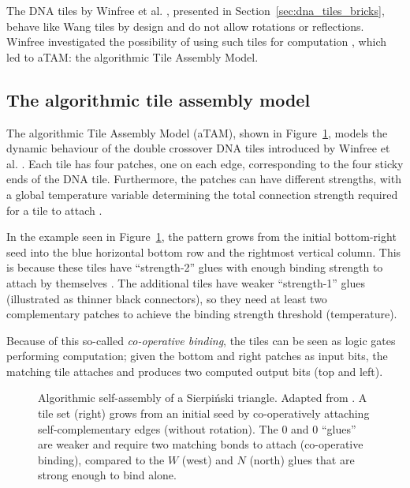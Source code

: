 The DNA tiles by Winfree et al. \cite{winfree1998design}, presented in Section~\ref{sec:dna_tiles_bricks}, behave like Wang tiles by design and do not allow rotations or reflections. Winfree investigated the possibility of using such tiles for computation \cite{winfree1998algorithmic}, which led to aTAM: the algorithmic Tile Assembly Model.

\subsection{The algorithmic tile assembly model}
\label{sec:atam}


The algorithmic Tile Assembly Model (aTAM), shown in Figure~\ref{fig:atam}, models the dynamic behaviour of the double crossover DNA tiles introduced by Winfree et al. \cite{winfree1998design}. Each tile has four patches, one on each edge, corresponding to the four sticky ends of the DNA tile. Furthermore, the patches can have different strengths, with a global temperature variable determining the total connection strength required for a tile to attach \cite{doty2012theory}.

In the example seen in Figure~\ref{fig:atam}, the pattern grows from the initial bottom-right seed into the blue horizontal bottom row and the rightmost vertical column. This is because these tiles have ``strength-2'' glues with enough binding strength to attach by themselves \cite{doty2012theory}. The additional tiles have weaker ``strength-1'' glues (illustrated as thinner black connectors), so they need at least two complementary patches to achieve the binding strength threshold (temperature).

Because of this so-called \emph{co-operative binding}, the tiles can be seen as logic gates performing computation; given the bottom and right patches as input bits, the matching tile attaches and produces two computed output bits (top and left).



\begin{figure}[ht]
  \centering
  \caption{Algorithmic self-assembly of a Sierpiński triangle. Adapted from \cite{doty2017}. A tile set (right) grows from an initial seed by co-operatively attaching self-complementary edges (without rotation). The \(0\) and \(0\) ``glues'' are weaker and require two matching bonds to attach (co-operative binding), compared to the \(W\) (west) and \(N\) (north) glues that are strong enough to bind alone.}
  \label{fig:atam}
\end{figure}

